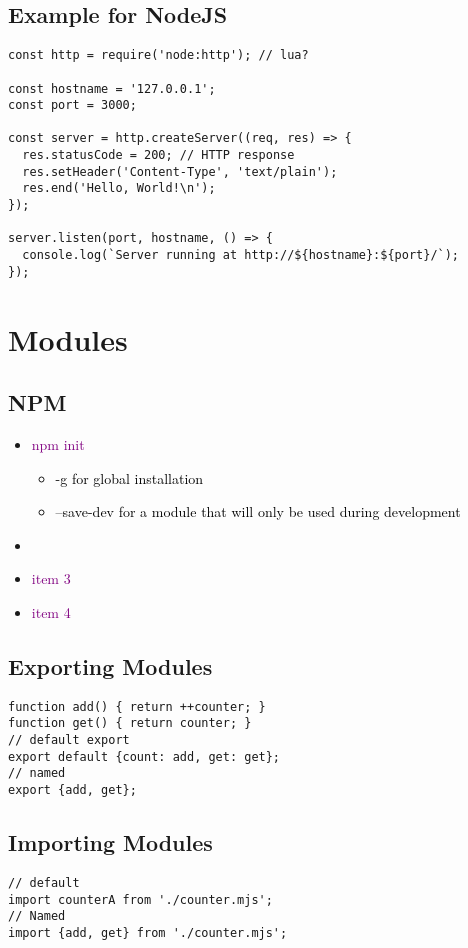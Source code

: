 \documentclass[main.tex,fontsize=8pt,paper=a4,paper=portrait,DIV=calc,]{scrartcl}
\begin{document}
\subsection{Example for NodeJS}
\begin{lstlisting}
const http = require('node:http'); // lua?

const hostname = '127.0.0.1';
const port = 3000;

const server = http.createServer((req, res) => {
  res.statusCode = 200; // HTTP response
  res.setHeader('Content-Type', 'text/plain');
  res.end('Hello, World!\n');
});

server.listen(port, hostname, () => {
  console.log(`Server running at http://${hostname}:${port}/`);
});
\end{lstlisting}

\section{Modules}
\subsection{NPM}
\begin{itemize}
\item \textcolor{purple}{npm init}\newline
  \begin{itemize}
  \item \textcolor{black}{-g for global installation}
  \item \textcolor{black}{--save-dev for a module that will only be used during development}
  \end{itemize} 
\item \textcolor{purple}{}
\item \textcolor{purple}{item 3}
\item \textcolor{purple}{item 4}
\end{itemize}

\subsection{Exporting Modules}
\begin{lstlisting}
function add() { return ++counter; }
function get() { return counter; }
// default export
export default {count: add, get: get};
// named
export {add, get};
\end{lstlisting}

\subsection{Importing Modules}
\begin{lstlisting}
// default
import counterA from './counter.mjs';
// Named
import {add, get} from './counter.mjs';
\end{lstlisting}
\end{document}
